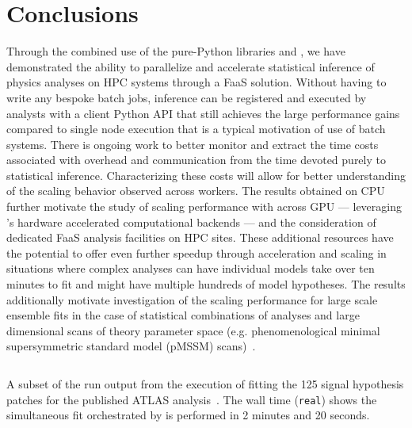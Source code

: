 \section{Conclusions}\label{sec:conclusions}

Through the combined use of the pure-Python libraries \funcX{} and \pyhf{}, we have demonstrated the ability to parallelize and accelerate statistical inference of physics analyses on HPC systems through a FaaS solution.
Without having to write any bespoke batch jobs, inference can be registered and executed by analysts with a client Python API that still achieves the large performance gains compared to single node execution that is a typical motivation of use of batch systems.
There is ongoing work to better monitor and extract the time costs associated with overhead and communication from the time devoted purely to statistical inference.
Characterizing these costs will allow for better understanding of the scaling behavior observed across workers.
The results obtained on CPU further motivate the study of scaling performance with \funcX{} across GPU --- leveraging \pyhf{}'s hardware accelerated computational backends --- and the consideration of dedicated FaaS analysis facilities on HPC sites.
These additional resources have the potential to offer even further speedup through acceleration and scaling in situations where complex analyses can have individual models take over ten minutes to fit and might have multiple hundreds of model hypotheses.
The results additionally motivate investigation of the scaling performance for large scale ensemble fits in the case of statistical combinations of analyses and large dimensional scans of theory parameter space (e.g. phenomenological minimal supersymmetric standard model (pMSSM) scans)~\cite{SUSY-2014-08,Ambrogi:2017lov}.

\begin{listing}
 \inputminted{text}{src/code/funcX_demo_output.txt}
 \caption{A subset of the run output from the execution of fitting the 125 signal hypothesis patches for the published ATLAS analysis~\cite{SUSY-2019-08}.
 The wall time (\texttt{real}) shows the simultaneous fit orchestrated by \funcX{} is performed in 2 minutes and 20 seconds.}
 \label{lst:funcX_demo_output}
\end{listing}
